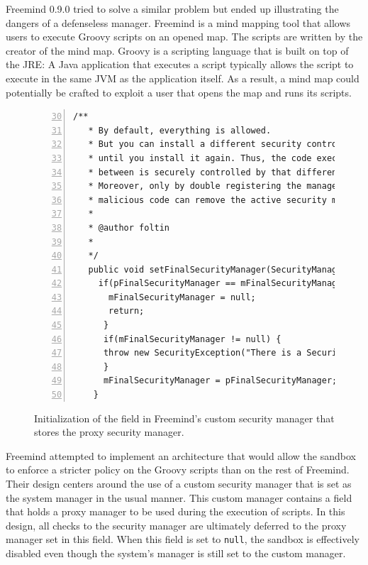 \documentclass{sig-alternate}
\begin{document}
Freemind 0.9.0 tried to solve a similar problem but ended up illustrating
the dangers of a defenseless manager. Freemind is a mind mapping tool
that allows users to execute Groovy scripts on an opened map. The
scripts are written by the creator of the mind map. Groovy is a scripting
language that is built on top of the JRE: A Java application that
executes a script typically allows the script to execute in the same
JVM as the application itself. As a result, a mind map could potentially
be crafted to exploit a user that opens the map and runs its scripts.

\begin{figure}
\begin{lstlisting}[numbers=left,basicstyle={\scriptsize},breaklines=true,firstnumber=30,xrightmargin={0.1cm},numbersep={-10pt}]
  /**  
   * By default, everything is allowed.  
   * But you can install a different security controller once,  
   * until you install it again. Thus, the code executed in   
   * between is securely controlled by that different security manager.  
   * Moreover, only by double registering the manager is removed. So, no   
   * malicious code can remove the active security manager.  
   *   
   * @author foltin  
   *  
   */
   public void setFinalSecurityManager(SecurityManager pFinalSecurityManager) {
	 if(pFinalSecurityManager == mFinalSecurityManager){
       mFinalSecurityManager = null;
	   return;
      } 		
      if(mFinalSecurityManager != null) {
      throw new SecurityException("There is a SecurityManager installed already."); 		
      } 		
      mFinalSecurityManager = pFinalSecurityManager;
    }	
\end{lstlisting}


\caption{Initialization of the field in Freemind's custom security manager
that stores the proxy security manager.}
\label{fig:Freemind-Security-Manager}
\end{figure}

Freemind attempted to implement an architecture that would allow the
sandbox to enforce a stricter policy on the Groovy scripts than on
the rest of Freemind. Their design centers around the use of a custom
security manager that is set as the system manager in the usual manner.
This custom manager contains a field that holds a proxy manager to be used during the execution of
scripts. In this design, all checks to the security manager are ultimately
deferred to the proxy manager set in this field. When
this field is set to \texttt{null}, the sandbox is effectively disabled
even though the system's manager is still set to the custom manager.
\end{document}
